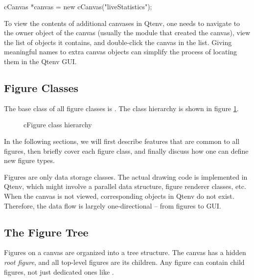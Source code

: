 \begin{cpp}
cCanvas *canvas = new cCanvas("liveStatistics");
\end{cpp}

To view the contents of additional canvases in Qtenv, one needs to navigate to
the owner object of the canvas (usually the module that created the canvas),
view the list of objects it contains, and double-click the canvas in the list.
Giving meaningful names to extra canvas objects can simplify the process of
locating them in the Qtenv GUI.


\subsection{Figure Classes}
\label{sec:graphics:figure-classes}

The base class of all figure classes is . The class hierarchy is
shown in figure \ref{fig:figure-inheritance}.

\begin{figure}[htbp]
  \begin{center}
    
    \caption{cFigure class hierarchy}
    \label{fig:figure-inheritance}
  \end{center}
\end{figure}

In the following sections, we will first describe features that are common to
all figures, then briefly cover each figure class, and finally discuss how one
can define new figure types.

\begin{note}
Figures are only data storage classes. The actual drawing code is implemented in
Qtenv, which might involve a parallel data structure, figure renderer classes,
etc. When the canvas is not viewed, corresponding objects in Qtenv do not exist.
Therefore, the data flow is largely one-directional -- from figures to GUI.
\end{note}


\subsection{The Figure Tree}
\label{sec:graphics:figure-tree}

Figures on a canvas are organized into a tree structure. The canvas has a hidden
\textit{root figure}, and all top-level figures are its children. Any figure can
contain child figures, not just dedicated ones like .

